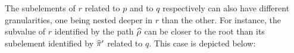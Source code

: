 \documentclass[11pt]{article}
\begin{document}
\begin{longtable}{l@{}l@{}}
\end{longtable}
   
The subelements of $r$ related to $p$ and to $q$ respectively can also
have different granularities, one being nested deeper in $r$ than the other. 
For instance, the subvalue of $r$ identified by the path $\widehat{\rho}$ can be 
closer to the root than its subelement identified by $\widehat{\pi}'$ related to 
$q$. This case is depicted below:
\end{document}
